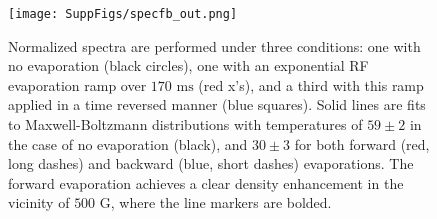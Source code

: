 \documentclass[%
 reprint,
 amsmath,amssymb,
 aps,
pra,
]{revtex4-1}
\begin{document}

\begin{figure}[tb]
\texttt{[image: SuppFigs/specfb\_out.png]}%
\caption{
Normalized spectra are performed under three conditions: one with no evaporation (black circles), one with an exponential RF evaporation ramp over $170\text{ ms}$ (red x's), and a third with this ramp applied in a time reversed manner (blue squares). Solid lines are fits to Maxwell-Boltzmann distributions with temperatures of $59\pm2$ in the case of no evaporation (black), and $30\pm3$ for both forward (red, long dashes) and backward (blue, short dashes) evaporations. The forward evaporation achieves a clear density enhancement in the vicinity of $500\text{ G}$, where the line markers are bolded. 
}
\label{fig:normenhance}
\end{figure}
\end{document}
